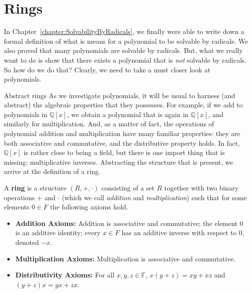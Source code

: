 \chapter{Rings}
\label{chapter:Rings}
\thispagestyle{empty}

In Chapter~\ref{chapter:SolvabilityByRadicals}, we finally were able to write down a formal definition of what is means for a polynomial to be solvable by radicals. We also proved that many polynomials are solvable by radicals. But, what we really want to do is show that there exists a polynomial that is \emph{not} solvable by radicals. So how do we do that? Clearly, we need to take a must closer look at polynomials. 


\begin{section}{Abstract rings}
As we investigate polynomials, it will be usual to harness (and abstract) the algebraic properties that they possesses. For example, if we add to polynomials in $\mathbb{Q}[x]$, we obtain a polynomial that is again in $\mathbb{Q}[x]$, and similarly for multiplication. And, as a matter of fact, the operations of polynomial addition and multiplication have many familiar properties: they are both associative and commutative, and the distributive property holds. In fact, $\mathbb{Q}[x]$ is rather close to being a field, but there is one import thing that is missing: multiplicative inverses. Abstracting the structure that is present, we arrive at the definition of a ring.

\begin{definition}
A \textbf{ring} is a structure $(R,+,\cdot)$ consisting of a set $R$ together with two binary operations $+$ and $\cdot$ (which we call \emph{addition} and \emph{multiplication}) such that for some elements $0\in F$ the following axioms hold.
\begin{itemize}
\item \textbf{Addition Axioms:} Addition is associative and commutative; the element $0$ is an additive identity; every  $x\in F$ has an additive inverse with respect to $0$, denoted $-x$.
\item \textbf{Multiplication Axioms:} Multiplication is associative and commutative.
\item \textbf{Distributivity Axioms:} For all $x,y,z \in \mathbb{F}$, $x(y+z) = xy+xz$ and $(y+z)x = yx+zx$.
\end{itemize}
\end{definition}

\end{section}